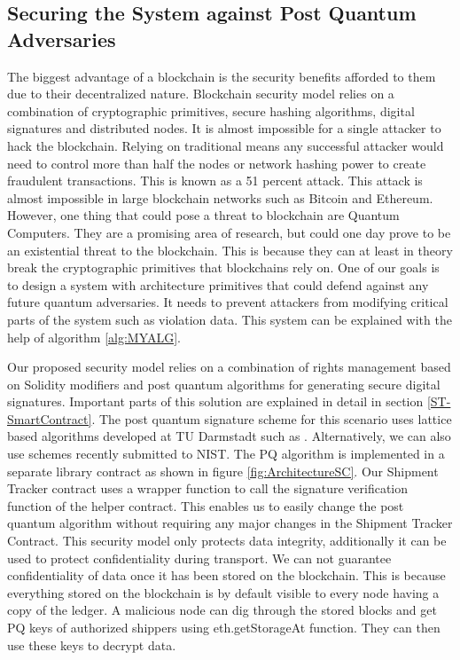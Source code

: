 \subsection{Securing the System against Post Quantum Adversaries}
The biggest advantage of a blockchain is the security benefits afforded to them due to their decentralized nature. Blockchain security model relies on a combination of cryptographic primitives, secure hashing algorithms, digital signatures and distributed nodes. It is almost impossible for a single attacker to hack the blockchain. Relying on traditional means any successful attacker would need to control more than half the nodes or network hashing power to create fraudulent transactions. This is known as a 51 percent attack. This attack is almost impossible in large blockchain networks such as Bitcoin and Ethereum. However, one thing that could pose a threat to blockchain are Quantum Computers. They are a promising area of research, but could one day prove to be an existential threat to the blockchain. This is because they can at least in theory break the cryptographic primitives that blockchains rely on. One of our goals is to design a system with architecture primitives that could defend against any future quantum adversaries. It needs to prevent attackers from modifying critical parts of the system such as violation data. This system can be explained with the help of algorithm \ref{alg:MYALG}.  

Our proposed security model relies on a combination of rights management based on Solidity modifiers and post quantum algorithms for generating secure digital signatures. Important parts of this solution are explained in detail in section \ref{ST-SmartContract}. The post quantum signature scheme for this scenario uses lattice based algorithms developed at TU Darmstadt such as \cite{cryptoeprint:2011:484}. Alternatively, we can also use schemes recently submitted to NIST. The PQ algorithm is implemented in a separate library contract as shown in figure \ref{fig:ArchitectureSC}. Our Shipment Tracker contract uses a wrapper function to call the signature verification function of the helper contract. This enables us to easily change the post quantum algorithm without requiring any major changes in the Shipment Tracker Contract. This security model only protects data integrity, additionally it can be used to protect confidentiality during transport. We can not guarantee confidentiality of data once it has been stored on the blockchain.  This is because everything stored on the blockchain is by default visible to every node having a copy of the ledger. A malicious node can dig through the stored blocks and get PQ keys of authorized shippers using eth.getStorageAt function. They can then use these keys to decrypt data. %

